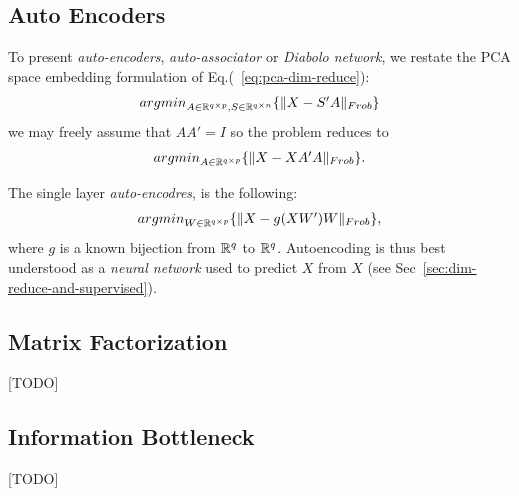 \documentclass[12pt,a4paper]{article}
\begin{document}
\subsection{Auto Encoders}
\label{sec:auto_encoders}

To present \emph{auto-encoders}, \aka \emph{auto-associator} or \emph{Diabolo network}, we restate the PCA space embedding formulation of Eq.(~\ref{eq:pca-dim-reduce}):
\begin{align}
	\textstyle{\mathop{argmin}_{A\in \mathbb{R}^{q \times p}, S\in \mathbb{R}^{q \times n}}}\{ \Vert X- S'A \Vert_{Frob} \}
\end{align}
we may freely assume that $AA'=I$ so the problem reduces to
\begin{align}
	\textstyle{\mathop{argmin}_{A\in \mathbb{R}^{q \times p}}}\{ \Vert X- XA'A \Vert_{Frob} \}.
\end{align}


The single layer \emph{auto-encodres}, is the following:
\begin{align}
	\textstyle{\mathop{argmin}_{W\in \mathbb{R}^{q\times p}}}\{ \Vert X- g(XW')W \Vert_{Frob} \},
\end{align}
where $g$ is a known bijection from $\mathbb{R}^q$ to $\mathbb{R}^q$.
Autoencoding is thus best understood as a \emph{neural network} used to predict $X$ from $X$ (see Sec~\ref{sec:dim-reduce-and-supervised}).







\subsection{Matrix Factorization}
\label{sec:matrix_factorization}
[TODO]



\subsection{Information Bottleneck}
[TODO]
\end{document}
